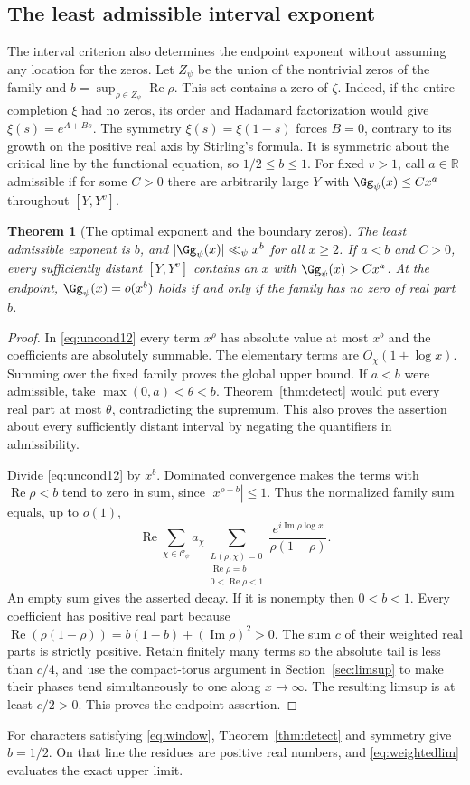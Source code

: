 \documentclass[a4paper,11pt]{article}
\newtheorem{theorem}[proposition]{Theorem}
\theoremstyle{definition}
\theoremstyle{remark}
\newcommand{\RR}{\mathbb R}\newcommand{\CC}{\mathbb C}\newcommand{\QQ}{\mathbb Q}
\newcommand{\real}{\operatorname{Re}}\newcommand{\imag}{\operatorname{Im}}
\numberwithin{equation}{section}
\begin{document}
\subsection{The least admissible interval exponent}\label{nav:I-12}
\label{sec:abscissa}
The interval criterion also determines the endpoint exponent without assuming any location for the zeros. Let \(Z_\psi\) be the union of the nontrivial zeros of the family and \(b=\sup_{\rho\in Z_\psi}\real\rho\). This set contains a zero of \(\zeta\). Indeed, if the entire completion \(\xi\) had no zeros, its order and Hadamard factorization would give \(\xi(s)=e^{A+Bs}\). The symmetry \(\xi(s)=\xi(1-s)\) forces \(B=0\), contrary to its growth on the positive real axis by Stirling's formula. It is symmetric about the critical line by the functional equation, so \(1/2\le b\le1\). For fixed \(v>1\), call \(a\in\RR\) admissible if for some \(C>0\) there are arbitrarily large \(Y\) with \(\Gg_\psi(x)\le Cx^a\) throughout \([Y,Y^v]\).

\begin{theorem}[The optimal exponent and the boundary zeros]\label{thm:abscissa}
The least admissible exponent is \(b\), and \(|\Gg_\psi(x)|\ll_\psi x^b\) for all \(x\ge2\). If \(a<b\) and \(C>0\), every sufficiently distant \([Y,Y^v]\) contains an \(x\) with \(\Gg_\psi(x)>Cx^a\). At the endpoint, \(\Gg_\psi(x)=o(x^b)\) holds if and only if the family has no zero of real part \(b\).
\end{theorem}
\begin{proof}
In \eqref{eq:uncond12} every term \(x^\rho\) has absolute value at most \(x^b\) and the coefficients are absolutely summable. The elementary terms are \(O_\chi(1+\log x)\). Summing over the fixed family proves the global upper bound. If \(a<b\) were admissible, take \(\max(0,a)<\theta<b\). Theorem~\ref{thm:detect} would put every real part at most \(\theta\), contradicting the supremum. This also proves the assertion about every sufficiently distant interval by negating the quantifiers in admissibility.

Divide \eqref{eq:uncond12} by \(x^b\). Dominated convergence makes the terms with \(\real\rho<b\) tend to zero in sum, since \(|x^{\rho-b}|\le1\). Thus the normalized family sum equals, up to \(o(1)\),
\[
 \real\sum_{\chi\in\mathcal C_\psi} a_\chi
          \sum_{\substack{L(\rho,\chi)=0\\\real\rho=b\\0<\real\rho<1}}
               \frac{e^{i\imag\rho\log x}}{\rho(1-\rho)} .
\]
An empty sum gives the asserted decay. If it is nonempty then \(0<b<1\). Every coefficient has positive real part because
\(\real(\rho(1-\rho))=b(1-b)+(\imag\rho)^2>0\). The sum \(c\) of their weighted real parts is strictly positive. Retain finitely many terms so the absolute tail is less than \(c/4\), and use the compact-torus argument in Section~\ref{sec:limsup} to make their phases tend simultaneously to one along \(x\to\infty\). The resulting limsup is at least \(c/2>0\). This proves the endpoint assertion.
\end{proof}
For characters satisfying \eqref{eq:window}, Theorem~\ref{thm:detect} and symmetry give \(b=1/2\). On that line the residues are positive real numbers, and \eqref{eq:weightedlim} evaluates the exact upper limit.
\end{document}
